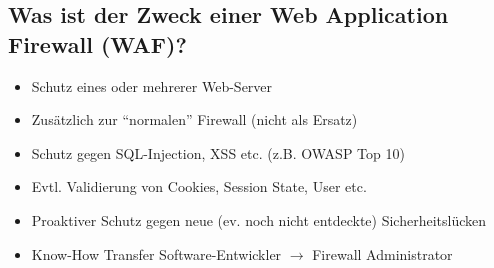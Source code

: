 \subsection*{Was ist der Zweck einer Web Application Firewall (WAF)?}
\begin{itemize}
    \item Schutz eines oder mehrerer Web-Server
    \item Zusätzlich zur "`normalen"' Firewall (nicht als Ersatz)
    \item Schutz gegen SQL-Injection, XSS etc. (z.B. OWASP Top 10)
    \item Evtl. Validierung von Cookies, Session State, User etc.
    \item Proaktiver Schutz gegen neue (ev. noch nicht entdeckte) Sicherheitslücken
    \item Know-How Transfer Software-Entwickler $\rightarrow$ Firewall Administrator
\end{itemize}